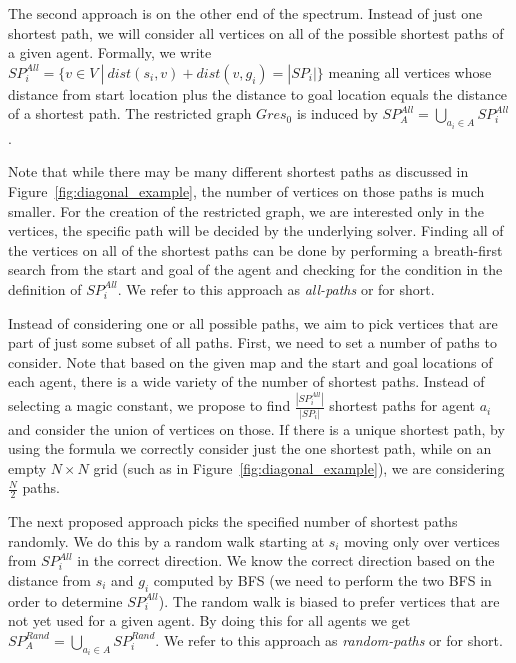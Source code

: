 The second approach is on the other end of the spectrum. Instead of just one shortest path, we will consider all vertices on all of the possible shortest paths of a given agent. Formally, we write $SP_i^{All} = \{ v \in V \: | \: dist(s_i,v) + dist(v,g_i) = |SP_i|\}$ meaning all vertices whose distance from start location plus the distance to goal location equals the distance of a shortest path. The restricted graph $Gres_{0}$ is induced by $SP_A^{All} = \bigcup_{a_i \in A} SP_i^{All}$.

Note that while there may be many different shortest paths as discussed in Figure~\ref{fig:diagonal_example}, the number of vertices on those paths is much smaller. For the creation of the restricted graph, we are interested only in the vertices, the specific path will be decided by the underlying solver. Finding all of the vertices on all of the shortest paths can be done by performing a breath-first search from the start and goal of the agent and checking for the condition in the definition of $SP_i^{All}$. We refer to this approach as \emph{all-paths} or \psa{} for short.




%
Instead of considering one or all possible paths, we aim to pick vertices that are part of just some subset of all paths. First, we need to set a number of paths to consider. Note that based on the given map and the start and goal locations of each agent, there is a wide variety of the number of shortest paths. Instead of selecting a magic constant, we propose to find $\frac{|SP_i^{All}|}{|SP_i|}$ shortest paths for agent $a_i$ and consider the union of vertices on those. If there is a unique shortest path, by using the formula we correctly consider just the one shortest path, while on an empty $N \times N$ grid (such as in Figure~\ref{fig:diagonal_example}), we are considering $\frac{N}{2}$ paths.

The next proposed approach picks the specified number of shortest paths randomly. We do this by a random walk starting at $s_i$ moving only over vertices from $SP_i^{All}$ in the correct direction. We know the correct direction based on the distance from $s_i$ and $g_i$ computed by BFS (we need to perform the two BFS in order to determine $SP_i^{All}$). The random walk is biased to prefer vertices that are not yet used for a given agent. By doing this for all agents we get $SP_A^{Rand} = \bigcup_{a_i \in A} SP_i^{Rand}$. We refer to this approach as \emph{random-paths} or \psr{} for short.




